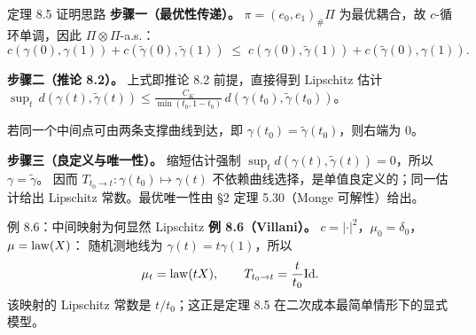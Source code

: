 \begin{frame}{定理 8.5 证明思路}
  \textbf{步骤一（最优性传递）。}\proofskipnote
  $\pi=(e_{0},e_{1})_{\#}\Pi$ 为最优耦合，故 $c$-循环单调，因此 $\Pi\otimes\Pi$-a.s.：
  \[
    c(\gamma(0),\gamma(1))+c(\tilde{\gamma}(0),\tilde{\gamma}(1))
    \;\le\; c(\gamma(0),\tilde{\gamma}(1))+c(\tilde{\gamma}(0),\gamma(1)).
  \]

  \textbf{步骤二（推论 8.2）。} 上式即推论 8.2 前提，直接得到 Lipschitz 估计
  $\sup_{t}\,d(\gamma(t),\tilde{\gamma}(t))\le\frac{C_{K}}{\min(t_{0},1-t_{0})}\,d(\gamma(t_{0}),\tilde{\gamma}(t_{0}))$。

  若同一个中间点可由两条支撑曲线到达，即 $\gamma(t_{0})=\tilde{\gamma}(t_{0})$，则右端为 $0$。

  \textbf{步骤三（良定义与唯一性）。}
  缩短估计强制 $\sup_{t}d(\gamma(t),\tilde{\gamma}(t))=0$，所以 $\gamma=\tilde{\gamma}$。
  因而 $T_{t_{0}\to t}\colon\gamma(t_{0})\mapsto\gamma(t)$ 不依赖曲线选择，是单值良定义的；同一估计给出 Lipschitz 常数。最优唯一性由 §2 定理 5.30（Monge 可解性）给出。

\end{frame}

\begin{frame}{例 8.6：中间映射为何显然 Lipschitz}
  \textbf{例 8.6（Villani）。} $c=|\cdot|^{2}$，$\mu_{0}=\delta_{0}$，$\mu=\operatorname{law}(X)$：
  随机测地线为 $\gamma(t)=t\gamma(1)$，所以
  \[
    \mu_{t}=\operatorname{law}(tX),
    \qquad
    T_{t_{0}\to t}=\frac{t}{t_{0}}\mathrm{Id} .
  \]
  该映射的 Lipschitz 常数是 $t/t_{0}$；这正是定理 8.5 在二次成本最简单情形下的显式模型。

\end{frame}

